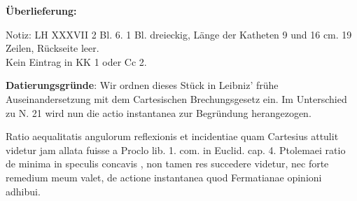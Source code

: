    
        
        \begin{ledgroupsized}[r]{120mm}
        \footnotesize 
        \pstart        
        \noindent\textbf{\"{U}berlieferung:}  
        \pend
        \end{ledgroupsized}
      
       
              \begin{ledgroupsized}[r]{114mm}
              \footnotesize 
              \pstart \parindent -6mm
              Notiz: LH XXXVII 2 Bl. 6. 1 Bl. dreieckig, L\"{a}nge der Katheten 9 und 16 cm. 19 Zeilen, R\"{u}ckseite leer.\\Kein Eintrag in KK 1 oder Cc 2. \pend
              \end{ledgroupsized}
        \vspace*{5mm}
        \begin{ledgroup}
        \footnotesize 
        \pstart
      \noindent\footnotesize{\textbf{Datierungsgr\"{u}nde}: Wir ordnen dieses St\"{u}ck in Leibniz' fr\"{u}he Auseinandersetzung mit dem Cartesischen Brechungsgesetz ein. Im Unterschied zu N. 21 wird nun die actio instantanea zur Begr\"{u}ndung herangezogen.}
        \pend
        \end{ledgroup}
      
        \vspace*{8mm}
        \pstart 
        \normalsize
       \centering [6 r\textsuperscript{o}] Ratio aequalitatis angulorum reflexionis\protect{}\protect{} et incidentiae\protect{}\pend \vspace{1.0ex} \pstart quam Cartesius\protect{} attulit videtur jam allata fuisse a Proclo\protect{} lib. 1. com. in Euclid. cap. 4. Ptolemaei\protect{} ratio de minima in speculis concavis\protect{} , non tamen res succedere videtur, nec forte remedium meum valet, de actione instantanea quod Fermatianae opinioni adhibui. \pend 